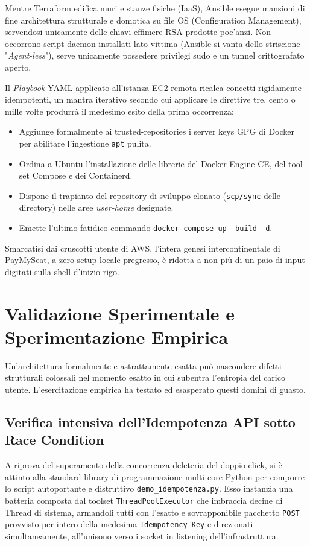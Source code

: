 \documentclass[11pt,a4paper]{report}
\begin{document}
Mentre Terraform edifica muri e stanze fisiche (IaaS), Ansible esegue mansioni di fine architettura strutturale e domotica su file OS (Configuration Management), servendosi unicamente delle chiavi effimere RSA prodotte poc'anzi. Non occorrono script daemon installati lato vittima (Ansible si vanta dello striscione "\textit{Agent-less}"), serve unicamente possedere privilegi sudo e un tunnel crittografato aperto.

Il \textit{Playbook} YAML applicato all'istanza EC2 remota ricalca concetti rigidamente idempotenti, un mantra iterativo secondo cui applicare le direttive tre, cento o mille volte produrr\`a il medesimo esito della prima occorrenza:
\begin{itemize}
    \item Aggiunge formalmente ai trusted-repositories i server keys GPG di Docker per abilitare l'ingestione \texttt{apt} pulita.
    \item Ordina a Ubuntu l'installazione delle librerie del Docker Engine CE, del tool set Compose e dei Containerd.
    \item Dispone il trapianto del repository di sviluppo clonato (\texttt{scp/sync} delle directory) nelle aree \textit{user-home} designate.
    \item Emette l'ultimo fatidico commando \texttt{docker compose up --build -d}.
\end{itemize}

Smarcatisi dai cruscotti utente di AWS, l'intera genesi intercontinentale di PayMySeat, a zero setup locale pregresso, \`e ridotta a non pi\`u di un paio di input digitati sulla shell d'inizio rigo.


\chapter{Validazione Sperimentale e Sperimentazione Empirica}

Un'architettura formalmente e astrattamente esatta pu\`o nascondere difetti strutturali colossali nel momento esatto in cui subentra l'entropia del carico utente. L'esercitazione empirica ha testato ed esasperato questi domini di guasto.

\section{Verifica intensiva dell'Idempotenza API sotto Race Condition}
A riprova del superamento della concorrenza deleteria del doppio-click, si \`e attinto alla standard library di programmazione multi-core Python per comporre lo script autoportante e distruttivo \texttt{demo\_idempotenza.py}. 
Esso instanzia una batteria composta dal toolset \texttt{ThreadPoolExecutor} che imbraccia decine di Thread di sistema, armandoli tutti con l'esatto e sovrapponibile pacchetto \texttt{POST} provvisto per intero della medesima \texttt{Idempotency-Key} e direzionati simultaneamente, all'unisono verso i socket in listening dell'infrastruttura.
\end{document}

